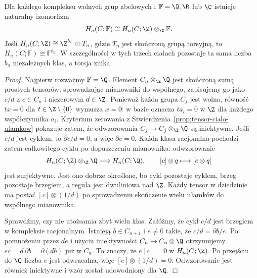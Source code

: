 \begin{twierdzenie}
\label{thm:homologia-char-zero}
Dla każdego kompleksu wolnych grup abelowych
i $\mathbb F=\Q,\R$ lub $\C$ istnieje naturalny
izomorfizm
\begin{equation}\label{eq:homologia-char-zero}
 H_n(C;\mathbb F)
 \cong H_n(C;\Z)\otimes_{\Z}\mathbb F.
\end{equation}
Jeśli $H_n(C;\Z)\cong\Z^{b_n}\oplus T_n$,
gdzie $T_n$ jest skończoną grupą torsyjną, to
$H_n(C;\mathbb F)\cong\mathbb F^{b_n}$.
W szczególności w tych trzech ciałach
pozostaje ta sama liczba $b_n$ niezależnych
klas, a torsja znika.
\end{twierdzenie}
\begin{proof}
Najpierw rozważmy $\mathbb F=\Q$.
Element $C_n\otimes_{\Z}\Q$ jest skończoną
sumą prostych tensorów; sprowadzając
mianowniki do wspólnego, zapisujemy go jako
$c/d$ z $c\in C_n$ i niezerowym
$d\in\Z$. Ponieważ każda grupa $C_j$
jest wolna, równość $tx=0$ dla $t\in\Z\setminus\{0\}$ wymusza
$x=0$: w bazie oznacza $ta_i=0$ w $\Z$ dla każdego współczynnika $a_i$.
Kryterium zerowania z
Stwierdzenia~\ref{prop:tensor-cialo-ulamkow} pokazuje zatem,
że odwzorowania $C_j\to C_j\otimes_{\Z}\Q$ są iniektywne.
Jeśli $c/d$ jest cyklem, to
$\partial c/d=0$, a więc $\partial c=0$.
Każda klasa racjonalna pochodzi zatem
całkowitego cyklu po dopuszczeniu mianownika:
odwzorowanie
\[
 H_n(C;\Z)\otimes_{\Z}\Q\longrightarrow H_n(C;\Q),
 \qquad [c]\otimes q\longmapsto[c\otimes q]
\]
jest surjektywne. Jest ono dobrze określone,
bo cykl pozostaje cyklem, brzeg pozostaje
brzegiem, a reguła jest dwuliniowa nad $\Z$.
Każdy tensor w dziedzinie ma postać $[c]\otimes(1/d)$
po sprowadzeniu skończenie wielu ułamków do wspólnego mianownika.

Sprawdźmy, czy nie utożsamia zbyt wielu klas.
Załóżmy, że cykl $c/d$ jest brzegiem
w kompleksie racjonalnym. Istnieją
$b\in C_{n+1}$ i $e\ne0$ takie, że
$c/d=\partial b/e$. Po pomnożeniu przez
$de$ i użyciu iniektywności
$C_n\to C_n\otimes\Q$ otrzymujemy
$ec=d\,\partial b=\partial(db)$
już w $C_n$. To znaczy, że $e[c]=0$
w $H_n(C;\Z)$. Po przejściu do $\Q$
liczba $e$ jest odwracalna, więc
$[c]\otimes(1/d)=0$. Odwzorowanie jest
również iniektywne i wzór został
udowodniony dla $\Q$.


\end{proof}
